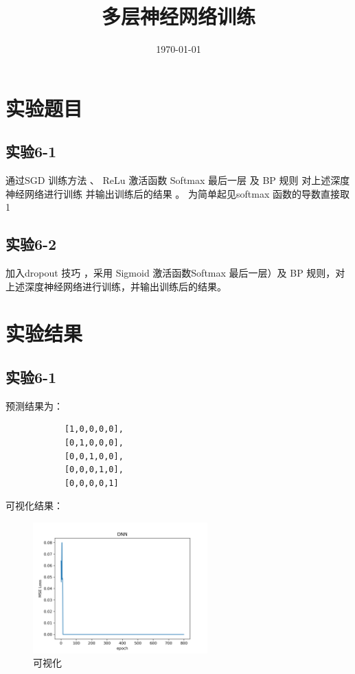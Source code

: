 \documentclass{../source/Experiment}
\title{多层神经网络训练}
\date{\today}
\begin{document}
\makecover
\section{实验题目}
\subsection{实验6-1}
通过SGD 训练方法 、 ReLu 激活函数 Softmax 最后一层 及 BP 规则 对上述深度神经网络进行训练 并输出训练后的结果 。 为简单起见softmax 函数的导数直接取 1
\subsection{实验6-2}
加入dropout 技巧 ，采用 Sigmoid 激活函数Softmax 最后一层）及 BP 规则，对 上述深度神经网络进行训练，并输出训练后的结果。
\section{实验结果}
\subsection{实验6-1}
预测结果为：
\begin{lstlisting}
            [1,0,0,0,0],
            [0,1,0,0,0],
            [0,0,1,0,0],
            [0,0,0,1,0],
            [0,0,0,0,1]
            \end{lstlisting}
可视化结果：
\begin{figure}[H]
    \centering
    \includegraphics[width = 0.6\textwidth]{Part6/6_1.png}
    \caption{可视化}
\end{figure}
\end{document}
